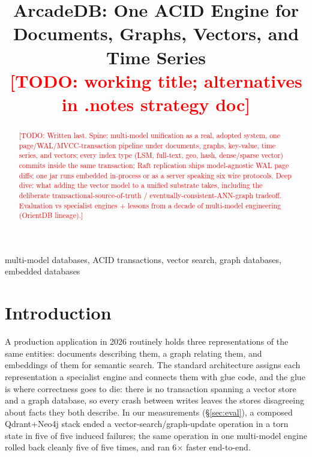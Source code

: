 \documentclass[conference]{IEEEtran}
\newcommand{\todo}[1]{\textcolor{red}{[TODO: #1]}}
\begin{document}
\title{ArcadeDB: One ACID Engine for Documents, Graphs, Vectors, and Time Series\\
{\large\todo{working title; alternatives in .notes strategy doc}}}

\author{
\and
{}
\and
{}
}

\maketitle

\begin{abstract}
\todo{Written last. Spine: multi-model unification as a real, adopted system,
one page/WAL/MVCC-transaction pipeline under documents, graphs, key-value,
time series, and vectors; every index type (LSM, full-text, geo, hash,
dense/sparse vector) commits inside the same transaction; Raft replication ships
model-agnostic WAL page diffs; one jar runs embedded in-process or as a server
speaking six wire protocols. Deep dive: what adding the vector model to a unified
substrate takes, including the deliberate transactional-source-of-truth /
eventually-consistent-ANN-graph tradeoff. Evaluation vs specialist engines +
lessons from a decade of multi-model engineering (OrientDB lineage).}
\end{abstract}

\begin{IEEEkeywords}
multi-model databases, ACID transactions, vector search, graph databases,
embedded databases
\end{IEEEkeywords}

\section{Introduction}\label{sec:intro}

A production application in 2026 routinely holds three representations of the
same entities: documents describing them, a graph relating them, and
embeddings of them for semantic search. The standard architecture assigns
each representation a specialist engine and connects them with glue code, and
the glue is where correctness goes to die: there is no transaction spanning a
vector store and a graph database, so every crash between writes leaves the
stores disagreeing about facts they both describe. In our measurements
(\S\ref{sec:eval}), a composed Qdrant+Neo4j stack ended a
vector-search/graph-update operation in a torn state in five of five induced
failures; the same operation in one multi-model engine rolled back cleanly
five of five times, and ran 6$\times$ faster end-to-end.
\end{document}
